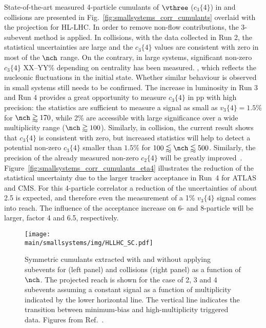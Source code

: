 \documentclass[../report.tex]{subfiles}
\providecommand{\main}{..}
\begin{document}
State-of-the-art measured 4-particle cumulants of $\vthree$ ($c_3\{4\}$) in \pp and \pPb collisions are presented in Fig.~\ref{fig:smallsystems_corr_cumulants} overlaid with the projection for HL-LHC.
In order to remove non-flow contributions, the 3-subevent method is applied. In \pp collisions, with the data collected in Run 2, the statistical uncertainties are large and the $c_3\{4\}$ values are consistent with zero in most of the $\nch$ range. On the contrary, in large systems, significant non-zero $c_3\{4\}$ XX--YY\% depending on centrality has been measured.
, which reflects the nucleonic fluctuations in the initial state. Whether similar behaviour is observed in small systems still needs to be confirmed. The increase in luminosity in Run 3 and Run 4 provides a great opportunity to measure $c_3\{4\}$ in pp with high precision: the statistics are sufficient to measure a signal as small as $v_3\{4\} = 1.5\%$ for $\nch \gtrapprox 170$, while 2\% are accessible with large significance over a wide multiplicity range ($\nch \gtrapprox 100$). Similarly, in \pPb collision, the current result shows that $c_3\{4\}$ is consistent with zero, but increased statistics will help to detect a potential non-zero $c_3\{4\}$ smaller than $1.5\%$ for $100 \lessapprox \nch \lessapprox 500$. Similarly, the precision of the already measured non-zero $c_2\{4\}$ will be greatly improved~\cite{ATL-PHYS-PUB-2018-014}.
Figure~\ref{fig:smallsystems_corr_cumulants_eta4} illustrates the reduction of the statistical uncertainty due to the larger tracker acceptance in Run~4 for ATLAS and CMS. For this 4-particle correlator a reduction of the uncertainties of about 2.5 is expected, and therefore even the measurement of a 1\% $v_3\{4\}$ signal comes into reach. The influence of the acceptance increase on 6- and 8-particle will be larger, factor 4 and 6.5, respectively.

\begin{figure}[t!]
\centering
\texttt{[image: \\main/smallsystems/img/HLLHC\_SC.pdf]}
\caption{Symmetric cumulants extracted with and without applying subevents for \pp (left panel) and \pPb collisions (right panel) as a function of $\nch$. The projected reach is shown for the case of 2, 3 and 4 subevents assuming a constant signal as a function of multiplicity indicated by the lower horizontal line. The vertical line indicates the transition between minimum-bias and high-multiplicity triggered data. Figures from Ref.~\cite{CMS-PAS-FTR-18-026}.}
\label{fig:smallsystems_corr_symmetriccumulants}
\end{figure}
\end{document}
